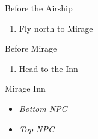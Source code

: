 \begin{paracol}{2}
\switchcolumn
\begin{steproute}{Before the Airship}
\end{steproute}

\switchcolumn
\newpage
\begin{enumerate}[resume]
    \item Fly north to Mirage
\end{enumerate}

\switchcolumn
\begin{steproute}{Before Mirage}
\end{steproute}

\switchcolumn
\resume
\begin{enumerate}[resume]
    \item Head to the Inn
\end{enumerate}

\begin{shop}{Mirage Inn}
    \varwb
    \begin{itemize}
        \item \textit{Bottom NPC}
    \end{itemize}
    \begin{sell}
        \item {}
        \item \kunai
        \item \knife
        \item \ribbon
        \item \boneMail
    \end{sell}
    \begin{buy}
        \item {} \heroDrink \space {}
        \item {} \speedDrink \space {}
        \item {} \revivify \space {}
    \end{buy}
    \begin{itemize}
        \item \textit{Top NPC}
    \end{itemize}
    \begin{buy}
        \item {} \phoenixDown \space {}
        \item {} \maidensKiss \space {}
        \item {} \antidote \space {}
    \end{buy}
    \varwe
\end{shop}


\end{paracol}
